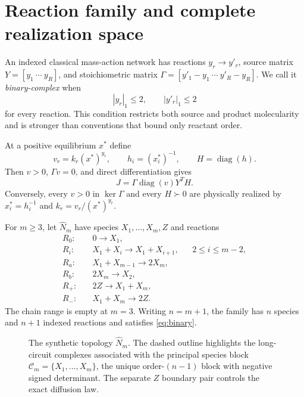\documentclass[11pt]{article}
\theoremstyle{definition}
\newcommand{\diag}{\operatorname{diag}}
\newcommand{\1}{\mathbf 1}
\newcommand{\cC}{\mathcal C}
\begin{document}
\section{Reaction family and complete realization space}

An indexed classical mass-action network has reactions $y_r\to y'_r$, source
matrix $Y=[y_1\ \cdots\ y_R]$, and stoichiometric matrix
$\Gamma=[y'_1-y_1\ \cdots\ y'_R-y_R]$.  We call it
\emph{binary-complex} when
\begin{equation}\label{eq:binary}
 |y_r|_1\le2,\qquad |y'_r|_1\le2
\end{equation}
for every reaction.  This condition restricts both source and product
molecularity and is stronger than conventions that bound only reactant order.

At a positive equilibrium $x^*$ define
\begin{equation}\label{eq:flux-h}
 v_r=k_r(x^*)^{y_r},\qquad h_i=(x_i^*)^{-1},\qquad H=\diag(h).
\end{equation}
Then $v>0$, $\Gamma v=0$, and direct differentiation gives
\begin{equation}\label{eq:jac-factor}
 J=\Gamma\diag(v)Y^TH.
\end{equation}
Conversely, every $v>0$ in $\ker\Gamma$ and every $H\succ0$ are physically
realized by $x_i^*=h_i^{-1}$ and $k_r=v_r/(x^*)^{y_r}$.

For $m\ge3$, let $\widehat N_m$ have species $X_1,\ldots,X_m,Z$ and reactions
\begin{align}
R_0:&\quad 0\longrightarrow X_1,\label{rxn:r0}\\
R_i:&\quad X_1+X_i\longrightarrow X_1+X_{i+1},
&&2\le i\le m-2,\label{rxn:chain}\\
R_a:&\quad X_1+X_{m-1}\longrightarrow2X_m,\label{rxn:terminal}\\
R_b:&\quad 2X_m\longrightarrow X_2,\label{rxn:return}\\
R_+:&\quad 2Z\longrightarrow X_1+X_m,\label{rxn:plus}\\
R_-:&\quad X_1+X_m\longrightarrow2Z.\label{rxn:minus}
\end{align}
The chain range is empty at $m=3$.  Writing $n=m+1$, the family has $n$
species and $n+1$ indexed reactions and satisfies \eqref{eq:binary}.

\begin{figure}[t]
\centering

\caption{The synthetic topology $\widehat N_m$.  The dashed outline highlights
the long-circuit complexes associated with the principal species block
$\cC_m=\{X_1,\ldots,X_m\}$, the unique order-$(n-1)$ block with negative signed
determinant.  The separate $Z$ boundary pair controls the exact diffusion law.}
\label{fig:network}
\end{figure}
\end{document}
